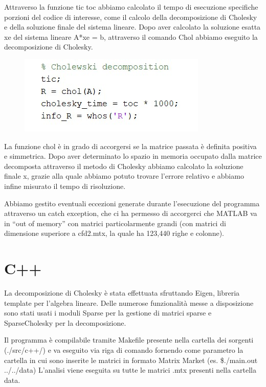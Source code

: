 \documentclass[a4paper,10pt]{article}
\begin{document}
Attraverso la funzione tic toc abbiamo calcolato il tempo di esecuzione specifiche porzioni del codice di interesse, come il calcolo della decomposizione di Cholesky e della soluzione finale del sistema lineare.
Dopo aver calcolato la soluzione esatta xe del sistema lineare A*xe = b, attraverso il comando Chol abbiamo eseguito la decomposizione di Cholesky. 

\begin{figure}[H]
\centering
\includegraphics[width=0.45\linewidth]{img/matlab2.jpg}
\label{fig:2}
\end{figure}

La funzione chol è in grado di accorgersi se la matrice passata è definita positiva e simmetrica. Dopo aver determinato lo spazio in memoria occupato dalla matrice decomposta attraverso il metodo di Cholesky abbiamo calcolato la soluzione finale x, grazie alla quale abbiamo potuto trovare l’errore relativo e abbiamo infine misurato il tempo di risoluzione.

Abbiamo gestito eventuali eccezioni generate durante l’esecuzione del programma attraverso un catch exception, che ci ha permesso di accorgerci che MATLAB va in “out of memory” con matrici particolarmente grandi (con matrici di dimensione superiore a cfd2.mtx, la quale ha 123,440 righe e colonne).

\newpage 

\section{C++}

La decomposizione di Cholesky è stata effettuata sfruttando Eigen, libreria template per l’algebra lineare. Delle numerose funzionalità messe a disposizione sono stati usati i moduli Sparse per la gestione di matrici sparse e SparseCholesky per la decomposizione.

Il programma è compilabile tramite Makefile presente nella cartella dei sorgenti (./src/c++/) e va eseguito via riga di comando fornendo come parametro la cartella in cui sono inserite le matrici in formato Matrix Market (es. \$./main.out ../../data)
L’analisi viene eseguita su tutte le matrici .mtx presenti nella cartella data.
\end{document}
